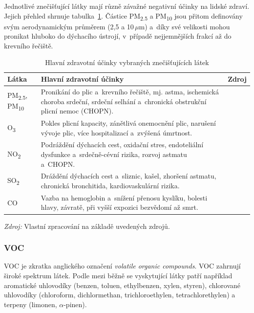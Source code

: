 \FloatBarrier
Jednotlivé znečišťující látky mají různě závažné negativní účinky na lidské zdraví. Jejich přehled shrnuje tabulka~\ref{tab:znecistujici-latky-ucinky}. Částice PM\textsubscript{2.5} a PM\textsubscript{10} jsou přitom definovány svým aerodynamickým průměrem (2,5 a 10\,$\mu\text{m}$) a~díky své velikosti mohou pronikat hluboko do dýchacího ústrojí, v~případě nejjemnějších frakcí až do krevního řečiště.

\begin{table}[!htbp]

\begin{center}
\footnotesize
\renewcommand{\arraystretch}{1.2}
\caption{Hlavní zdravotní účinky vybraných znečišťujících látek}\label{tab:znecistujici-latky-ucinky}
\begin{tabularx}{\textwidth}{p{2.0cm} X p{3.2cm}}
\toprule
\textbf{Látka} & \textbf{Hlavní zdravotní účinky} & \textbf{Zdroj} \\
\midrule
PM\textsubscript{2.5}, PM\textsubscript{10} & Pronikání do plic a~krevního řečiště, mj. astma, ischemická choroba srdeční, srdeční selhání a~chronická obstrukční plicní nemoc (CHOPN). & \parencite{usepaIndoorPollutantsSources2015} \\
O\textsubscript{3} & Pokles plicní kapacity, zánětlivá onemocnění plic, narušení vývoje plic, více hospitalizací a~zvýšená úmrtnost. & \parencite{worldhealthorganizationWHOGlobalAir2021} \\
NO\textsubscript{2} & Podráždění dýchacích cest, oxidační stres, endoteliální dysfunkce a~srdečně-cévní rizika, rozvoj astmatu a~CHOPN. & \parencite{usepaNitrogenDioxidesImpact2014} \\
SO\textsubscript{2} & Dráždění dýchacích cest a~sliznic, kašel, zhoršení astmatu, chronická bronchitida, kardiovaskulární rizika. & \parencite{usepaSulfurDioxideBasics2016} \\
CO & Vazba na hemoglobin a~snížení přenosu kyslíku, bolesti hlavy, závratě, při vyšší expozici bezvědomí až smrt. & \parencite{usepaBasicInformationCarbon2016} \\
\bottomrule
\end{tabularx}

\footnotesize \textit{Zdroj:} Vlastní zpracování na základě uvedených zdrojů.
\end{center}
\end{table}

\FloatBarrier
\subsubsection{VOC}
VOC je zkratka anglického označení \textit{volatile organic compounds}.
VOC zahrnují široké spektrum látek. Podle \textcite{lancea.wallaceVOLATILEORGANICCOMPOUNDS1991} mezi běžně se vyskytující látky patří například aromatické uhlovodíky (benzen, toluen, ethylbenzen, xylen, styren), chlorované uhlovodíky (chloroform, dichlormethan, trichloroethylen, tetrachlorethylen) a terpeny (limonen, $\alpha$-pinen).


